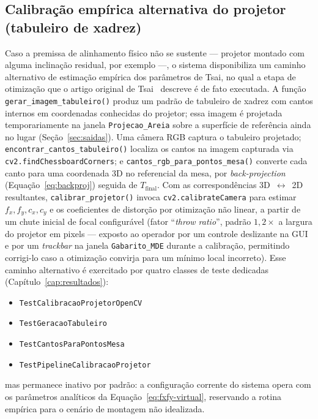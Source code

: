 \subsection{Calibração empírica alternativa do projetor (tabuleiro de xadrez)}
\label{subsec:calib-empirica-projetor}

Caso a premissa de alinhamento físico não se sustente — projetor
montado com alguma inclinação residual, por exemplo —, o sistema
disponibiliza um caminho alternativo de estimação empírica dos
parâmetros de Tsai, no qual a etapa de otimização que o artigo original
de Tsai~ descreve é de fato executada. A
função \texttt{gerar\_imagem\_tabuleiro()} produz um padrão de
tabuleiro de xadrez com cantos internos em coordenadas conhecidas do
projetor; essa imagem é projetada temporariamente na janela
\texttt{Projecao\_Areia} sobre a superfície de referência ainda no
lugar (Seção~\ref{sec:saidas}). Uma câmera RGB captura o tabuleiro
projetado; \texttt{encontrar\_cantos\_tabuleiro()} localiza os cantos
na imagem capturada via \texttt{cv2.findChessboardCorners}; e
\texttt{cantos\_rgb\_para\_pontos\_mesa()} converte cada canto para uma
coordenada 3D no referencial da mesa, por \textit{back-projection}
(Equação~\eqref{eq:backproj}) seguida de $T_{\text{final}}$. Com as
correspondências 3D~$\leftrightarrow$~2D resultantes,
\texttt{calibrar\_projetor()} invoca \texttt{cv2.calibrateCamera} para
estimar $f_x, f_y, c_x, c_y$ e os coeficientes de distorção por
otimização não linear, a partir de um chute inicial de focal
configurável (fator ``\textit{throw ratio}'', padrão $1{,}2 \times$ a
largura do projetor em pixels — exposto ao operador por um controle
deslizante na GUI e por um \textit{trackbar} na janela
\texttt{Gabarito\_MDE} durante a calibração, permitindo corrigi-lo caso
a otimização convirja para um mínimo local incorreto). Esse caminho
alternativo é exercitado por quatro classes de teste dedicadas
(Capítulo~\ref{cap:resultados}):

\begin{itemize}
    \item \texttt{TestCalibracaoProjetorOpenCV}
    \item \texttt{TestGeracaoTabuleiro}
    \item \texttt{TestCantosParaPontosMesa}
    \item \texttt{TestPipelineCalibracaoProjetor}
\end{itemize}

\noindent mas permanece inativo por padrão: a configuração corrente do
sistema opera com os parâmetros analíticos da
Equação~\eqref{eq:fxfy-virtual}, reservando a rotina empírica para o
cenário de montagem não idealizada.

